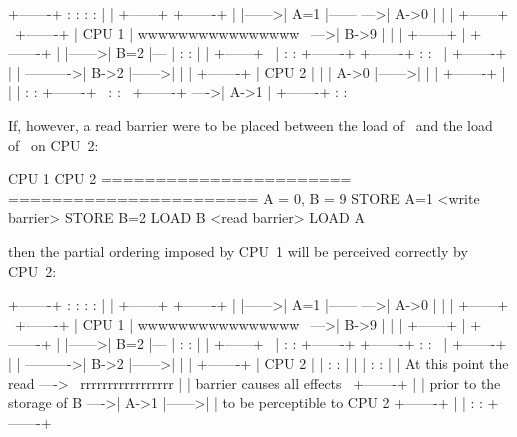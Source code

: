   \begin{VerbatimU}
	+-------+       :      :                :       :
	|       |       +------+                +-------+
	|       |------>| A=1  |------      --->| A->0  |
	|       |       +------+      \         +-------+
	| CPU 1 |   wwwwwwwwwwwwwwww   \    --->| B->9  |
	|       |       +------+        |       +-------+
	|       |------>| B=2  |---     |       :       :
	|       |       +------+   \    |       :       :       +-------+
	+-------+       :      :    \   |       +-------+       |       |
	                             ---------->| B->2  |------>|       |
	                                |       +-------+       | CPU 2 |
	                                |       | A->0  |------>|       |
	                                |       +-------+       |       |
	                                |       :       :       +-------+
	                                 \      :       :
	                                  \     +-------+
	                                   ---->| A->1  |
	                                        +-------+
	                                        :       :
\end{VerbatimU}

If, however, a read barrier were to be placed between the load of~ and the
load of~ on CPU~2:

\begin{VerbatimU}
	CPU 1                   CPU 2
	=======================	=======================
		{ A = 0, B = 9 }
	STORE A=1
	<write barrier>
	STORE B=2
	                        LOAD B
	                        <read barrier>
	                        LOAD A
\end{VerbatimU}

\noindent%
then the partial ordering imposed by CPU~1 will be perceived correctly by
CPU~2:

\begin{VerbatimU}
	+-------+       :      :                :       :
	|       |       +------+                +-------+
	|       |------>| A=1  |------      --->| A->0  |
	|       |       +------+      \         +-------+
	| CPU 1 |   wwwwwwwwwwwwwwww   \    --->| B->9  |
	|       |       +------+        |       +-------+
	|       |------>| B=2  |---     |       :       :
	|       |       +------+   \    |       :       :       +-------+
	+-------+       :      :    \   |       +-------+       |       |
	                             ---------->| B->2  |------>|       |
	                                |       +-------+       | CPU 2 |
	                                |       :       :       |       |
	                                |       :       :       |       |
	  At this point the read ---->   \  rrrrrrrrrrrrrrrrr   |       |
	  barrier causes all effects      \     +-------+       |       |
	  prior to the storage of B        ---->| A->1  |------>|       |
	  to be perceptible to CPU 2            +-------+       |       |
	                                        :       :       +-------+
\end{VerbatimU}

